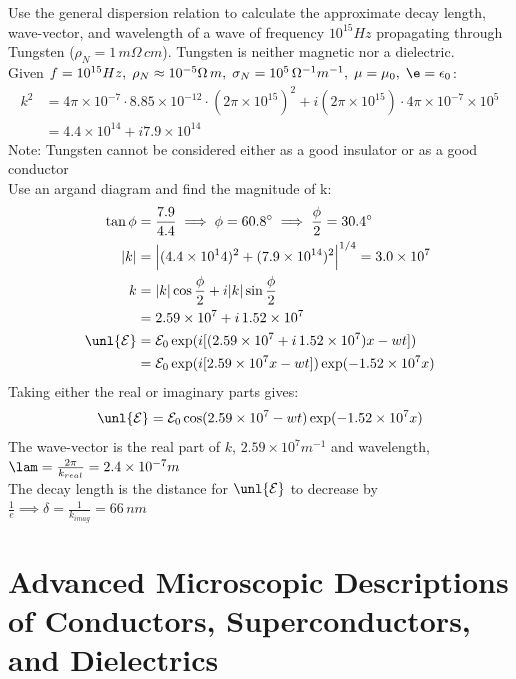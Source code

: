 \documentclass[a4paper, 11pt, normalem]{report}
\renewcommand\E{\mathcal{E}}
\newcommand\uE{\unl{\E}}
\newcommand\eno{\epsilon_0}
\begin{document}
\begin{example}
Use the general dispersion relation to calculate the approximate decay length, wave-vector, and wavelength of a wave of frequency $10^{15}Hz$ propagating through Tungsten ($\rho_N = 1\,m\Omega\,cm$).
Tungsten is neither magnetic nor a dielectric. \\
Given $f = 10^{15}Hz,\;\rho_N \approx 10^{-5}\Omega\,m,\;\sigma_N = 10^5\,\Omega^{-1}m^{-1},\;\mu=\mu_0,\;\e=\eno$:
\begin{align}
    k^2 &= 4\pi\times10^{-7}\cdot8.85\times10^{-12}\cdot(2\pi\times10^{15})^2 + i(2\pi\times10^{15})\cdot4\pi\times10^{-7}\times10^5 \\
    &= 4.4\times10^{14} + i7.9\times10^{14}
\end{align}
Note: Tungsten cannot be considered either as a good insulator or as a good conductor \\
Use an argand diagram and find the magnitude of k:
\begin{align}
    \tan\phi &= \frac{7.9}{4.4} \implies \phi = 60.8^\circ \implies \frac{\phi}{2} = 30.4^\circ \\
    |k| &= \Big|(4.4\times10^14)^2 + (7.9\times10^{14})^2\Big|^{1/4} = 3.0\times10^7 \\
    k &= |k|\cos\frac{\phi}{2} + i|k|\sin\frac{\phi}{2} \\
    &= 2.59\times10^7 + i\,1.52\times10^7 \\
    \uE &= \E_0 \exp(i[(2.59\times10^7 + i\,1.52\times10^7)x - wt]) \\
    &= \E_0 \exp(i[2.59\times10^7x - wt])\exp(-1.52\times10^7x)
\end{align}
Taking either the real or imaginary parts gives:
\begin{equation}
    \uE = \E_0 \cos(2.59\times10^7 - wt)\exp(-1.52\times10^7x)
\end{equation}
The wave-vector is the real part of $k$, $2.59\times10^7m^{-1}$ and wavelength, $\lam = \frac{2\pi}{k_{real}} = 2.4\times10^{-7}m$ \\
The decay length is the distance for $\uE$ to decrease by $\frac{1}{e} \implies \delta = \frac{1}{k_{imag}} = 66\,nm$
\end{example}

\section{Advanced Microscopic Descriptions of Conductors, Superconductors, and Dielectrics}
\end{document}
